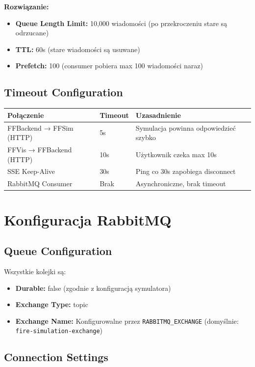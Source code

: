 \textbf{Rozwiązanie:}
\begin{itemize}
    \item \textbf{Queue Length Limit:} 10,000 wiadomości (po przekroczeniu stare są odrzucane)
    \item \textbf{TTL:} 60s (stare wiadomości są usuwane)
    \item \textbf{Prefetch:} 100 (consumer pobiera max 100 wiadomości naraz)
\end{itemize}

\subsection{Timeout Configuration}

\begin{longtable}{|l|l|p{5cm}|}
\hline
\textbf{Połączenie} & \textbf{Timeout} & \textbf{Uzasadnienie} \\
\hline
FFBackend → FFSim (HTTP) & 5s & Symulacja powinna odpowiedzieć szybko \\
\hline
FFVis → FFBackend (HTTP) & 10s & Użytkownik czeka max 10s \\
\hline
SSE Keep-Alive & 30s & Ping co 30s zapobiega disconnect \\
\hline
RabbitMQ Consumer & Brak & Asynchroniczne, brak timeout \\
\hline
\end{longtable}

\section{Konfiguracja RabbitMQ}

\subsection{Queue Configuration}

Wszystkie kolejki są:
\begin{itemize}
    \item \textbf{Durable:} false (zgodnie z konfiguracją symulatora)
    \item \textbf{Exchange Type:} topic
    \item \textbf{Exchange Name:} Konfigurowalne przez \texttt{RABBITMQ\_EXCHANGE} (domyślnie: \texttt{fire-simulation-exchange})
\end{itemize}

\subsection{Connection Settings}

